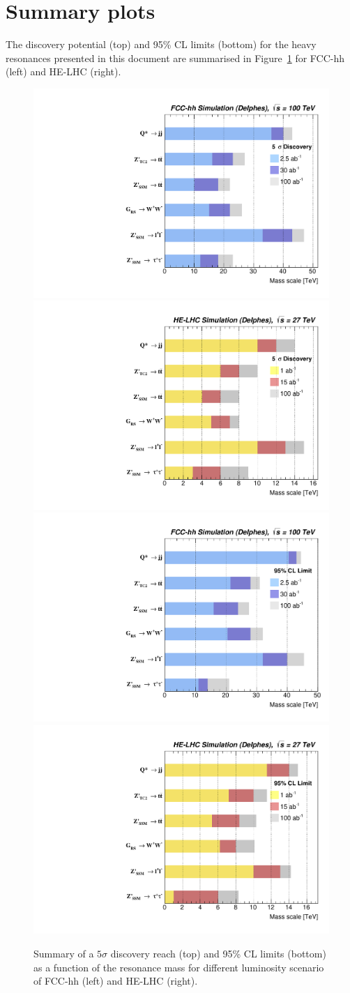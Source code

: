 \section{Summary plots}
The discovery potential (top) and 95\% CL limits (bottom) for the heavy resonances presented in this document are summarised in Figure~\ref{figure:resonances100:summary} for FCC-hh (left) and HE-LHC (right).
\begin{figure}[!htb]
  \centering
  \includegraphics[width=0.49\columnwidth]{Fig/summaryDisco_onlyFCChh.pdf}
  \includegraphics[width=0.49\columnwidth]{Fig/summaryDisco_onlyHELHC.pdf}
   \includegraphics[width=0.49\columnwidth]{Fig/summaryLimit_onlyFCChh.pdf}
  \includegraphics[width=0.49\columnwidth]{Fig/summaryLimit_onlyHELHC.pdf}
  \caption{Summary of a $5\sigma$ discovery reach (top) and 95\% CL limits (bottom) as a function of the resonance mass for different luminosity scenario of FCC-hh (left) and HE-LHC (right).}
  \label{figure:resonances100:summary}
\end{figure}

